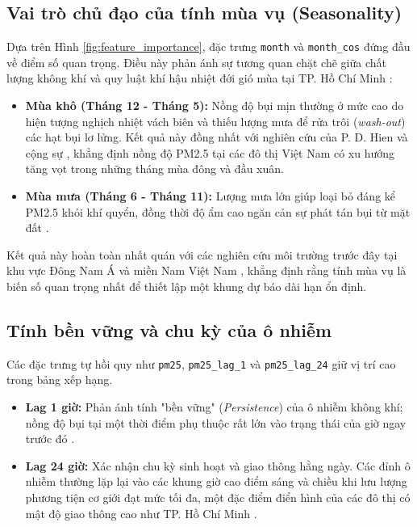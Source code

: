 \subsection{Vai trò chủ đạo của tính mùa vụ (Seasonality)}

Dựa trên Hình \ref{fig:feature_importance}, đặc trưng \texttt{month} và \texttt{month\_cos} đứng đầu về điểm số quan trọng. Điều này phản ánh sự tương quan chặt chẽ giữa chất lượng không khí và quy luật khí hậu nhiệt đới gió mùa tại TP. Hồ Chí Minh \cite{To2024, Bui2023}:
\begin{itemize}
    \item \textbf{Mùa khô (Tháng 12 - Tháng 5):} Nồng độ bụi mịn thường ở mức cao do hiện tượng nghịch nhiệt vách biên và thiếu lượng mưa để rửa trôi (\textit{wash-out}) các hạt bụi lơ lửng. Kết quả này đồng nhất với nghiên cứu của P. D. Hien và cộng sự \cite{Hien2002}, khẳng định nồng độ PM2.5 tại các đô thị Việt Nam có xu hướng tăng vọt trong những tháng mùa đông và đầu xuân.
    \item \textbf{Mùa mưa (Tháng 6 - Tháng 11):} Lượng mưa lớn giúp loại bỏ đáng kể PM2.5 khỏi khí quyển, đồng thời độ ẩm cao ngăn cản sự phát tán bụi từ mặt đất \cite{Oanh2006, Bui2023}.
\end{itemize}
Kết quả này hoàn toàn nhất quán với các nghiên cứu môi trường trước đây tại khu vực Đông Nam Á và miền Nam Việt Nam \cite{Bui2023, Oanh2006}, khẳng định rằng tính mùa vụ là biến số quan trọng nhất để thiết lập một khung dự báo dài hạn ổn định.

\subsection{Tính bền vững và chu kỳ của ô nhiễm}

Các đặc trưng tự hồi quy như \texttt{pm25}, \texttt{pm25\_lag\_1} và \texttt{pm25\_lag\_24} giữ vị trí cao trong bảng xếp hạng. 
\begin{itemize}
    \item \textbf{Lag 1 giờ:} Phản ánh tính "bền vững" (\textit{Persistence}) của ô nhiễm không khí; nồng độ bụi tại một thời điểm phụ thuộc rất lớn vào trạng thái của giờ ngay trước đó \cite{Tai2010, bermejo2023time}.
    \item \textbf{Lag 24 giờ:} Xác nhận chu kỳ sinh hoạt và giao thông hằng ngày. Các đỉnh ô nhiễm thường lặp lại vào các khung giờ cao điểm sáng và chiều khi lưu lượng phương tiện cơ giới đạt mức tối đa, một đặc điểm điển hình của các đô thị có mật độ giao thông cao như TP. Hồ Chí Minh \cite{Nguyen2019, Bui2023}.
\end{itemize}

